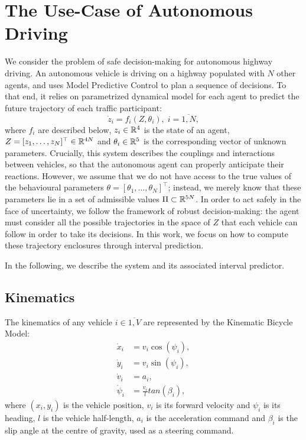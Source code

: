 \documentclass{article}
\begin{document}
\section{The Use-Case of Autonomous Driving}


We consider the problem of safe decision-making for autonomous highway driving. An autonomous vehicle is driving on a highway populated with $N$ other agents, and uses Model Predictive Control to plan a sequence of decisions. To that end, it relies on parametrized dynamical model for each agent to predict the future trajectory of each traffic participant: \[\dot{z}_i=f_i(Z,\theta_i),\;i=\overline{1,N},\] where $f_i$ are described below, $z_i\in\mathbb{R}^4$ is the state of an agent, $Z = [z_1,\dots,z_N]^\top\in\mathbb{R}^{4N}$ and $\theta_i\in\mathbb{R}^5$ is the corresponding vector of unknown parameters. Crucially, this system describes the couplings and interactions between vehicles, so that the autonomous agent can properly anticipate their reactions. 
However, we assume that we do not have access to the true values of the behavioural parameters $\theta=[\theta_1,\dots,\theta_N]^\top$; instead, we merely know that these parameters lie in a set of admissible values $\Pi\subset\mathbb{R}^{5N}$. In order to act safely in the face of uncertainty, we follow the framework of robust decision-making: the agent must consider all the possible trajectories in the space of $Z$ that each vehicle can follow in order to take its decisions. In this work, we focus on how to compute these trajectory enclosures through interval prediction.

In the following, we describe the system and its associated interval predictor.

\subsection{Kinematics}

The kinematics of any vehicle $i\in\overline{1,V}$ are represented by the Kinematic Bicycle Model:
\begin{align}
	\dot{x}_i &= v_i\cos(\psi_i), \nonumber\\
	\dot{y}_i &= v_i\sin(\psi_i), \nonumber\\
	\dot{v}_i &= a_i, \nonumber\\
	\dot{\psi}_i &= \frac{v_i}{l}tan(\beta_i), \nonumber
\end{align}
where $(x_i, y_i)$ is the vehicle position, $v_i$ is its forward velocity and $\psi_i$ is its heading, $l$ is the vehicle half-length, $a_i$ is the acceleration command and $\beta_i$ is the slip angle at the centre of gravity, used as a steering command.
\end{document}
